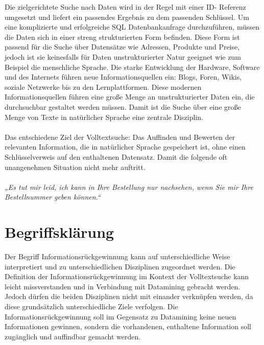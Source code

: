 Die zielgerichtete Suche nach Daten wird in der Regel mit einer ID-
Referenz umgesetzt und liefert ein passendes Ergebnis zu dem passenden
Schlüssel. Um eine komplizierte und erfolgreiche SQL Datenbankanfrage
durchzuführen, müssen die Daten sich in einer streng strukturierten
Form befinden. Diese Form ist passend für die Suche über Datensätze wie
Adressen, Produkte und Preise, jedoch ist sie keinesfalls für Daten
unstrukturierter Natur geeignet %
wie zum Beispiel die menschliche Sprache.
\newline
Die starke Entwicklung der Hardware, Software und des Internets führen
neue Informationsquellen ein: Blogs, Foren, Wikis, soziale Netzwerke
bis zu den Lernplattformen. Diese modernen Informationsquellen führen
eine große Menge an unstrukturierter Daten ein, die durchsuchbar
gestaltet werden müssen. Damit ist die Suche über eine große Menge von
Texte in natürlicher Sprache eine zentrale Disziplin. 
\\\\
Das entschiedene Ziel der Volltextsuche: Das Auffinden und Bewerten der
relevanten Information, die in natürlicher Sprache gespeichert ist,
ohne einen Schlüsselverweis auf den enthaltenen Datensatz. 
\newline
Damit die folgende oft unangenehmen Situation nicht mehr auftritt.
\\\\
\textit{„Es tut mir leid, ich kann in Ihre Bestellung nur nachsehen, wenn Sie
mir Ihre Bestellnummer geben können.“}

\section[Begriffsklärung]{Begriffsklärung}
Der Begriff Informationsrückgewinnung kann auf unterschiedliche Weise
interpretiert und zu unterschiedlichen Disziplinen zugeordnet werden. 
\newline
Die Definition der Informationsrückgewinnung im Kontext der
Volltextsuche kann leicht missverstanden und in Verbindung mit
Datamining gebracht werden. Jedoch dürfen die beiden Disziplinen nicht
mit einander verknüpfen werden, da diese grundsätzlich unterschiedliche
Ziele verfolgen.
\newline
Die Informationsrückgewinnung soll im Gegensatz zu Datamining keine
neuen Informationen gewinnen, sondern die vorhandenen, enthaltene
Information soll zugänglich und auffindbar gemacht werden.

